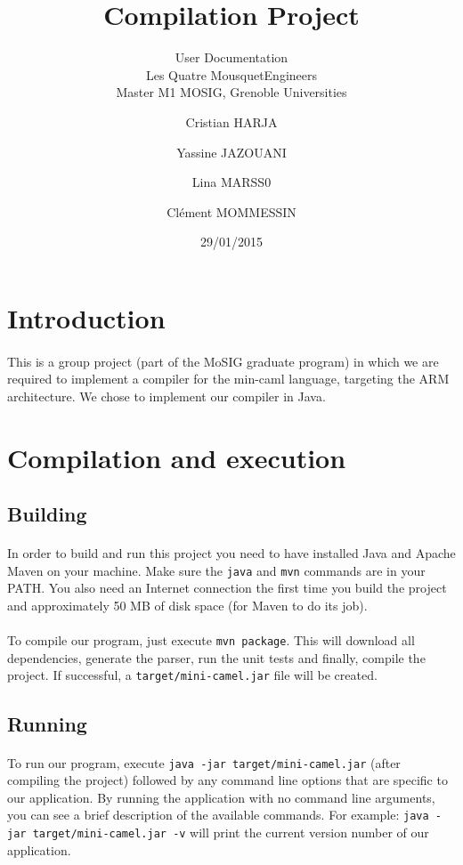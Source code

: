 \documentclass[a4paper,10pt]{article}
\title{Compilation Project}
\subtitle{User Documentation\\ 
Les Quatre MousquetEngineers\\ Master M1 MOSIG, Grenoble Universities}
\author{Cristian HARJA \and Yassine JAZOUANI \and Lina MARSS0 
\and Cl\'{e}ment MOMMESSIN}
\date{29/01/2015}
\begin{document}
\maketitle

\section{Introduction}
\paragraph{}
	This is a group project (part of the MoSIG graduate program) in which we are
	required to implement a compiler for the min-caml language, targeting the ARM architecture.
	We chose to implement our compiler in Java.

\section{Compilation and execution}
	\subsection{Building}
		\paragraph{}
			In order to build and run this project you need to have installed Java 
			and Apache Maven on your machine. Make sure the \texttt{java} and \texttt{mvn} commands 
			are in your PATH. You also need an Internet connection the first time
			 you build the project and approximately 50 MB of disk space (for Maven to do its job).
			 
		\paragraph{}
			To compile our program, just execute \texttt{mvn package}. This will download all 
			dependencies, generate the parser, run the unit tests and finally, 
			compile the project. If successful, a \texttt{target/mini-camel.jar} file will be created.
		
	\subsection{Running}
		\paragraph{}
			To run our program, execute \texttt{java -jar target/mini-camel.jar} 
			(after compiling the project) followed by any command line options that 
			are specific to our application. By running the application with no command 
			line arguments, you can see a brief description of the available commands. 
			For example: \texttt{java -jar target/mini-camel.jar -v} will print the current 
			version number of our application.
\end{document}

